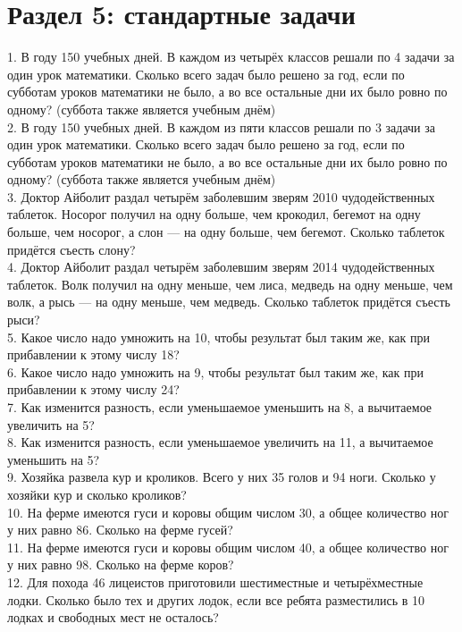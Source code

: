 \section{Раздел 5: стандартные задачи}
1. В году 150 учебных дней. В каждом из четырёх классов решали по 4 задачи за один урок математики. Сколько всего задач было решено за год, если по субботам уроков математики не было, а во все остальные дни их было ровно по одному? (суббота также является учебным днём)\\
2. В году 150 учебных дней. В каждом из пяти классов решали по 3 задачи за один урок математики. Сколько всего задач было решено за год, если по субботам уроков математики не было, а во все остальные дни их было ровно по одному? (суббота также является учебным днём)\\
3. Доктор Айболит раздал четырём заболевшим зверям 2010 чудодейственных таблеток. Носорог получил на одну больше, чем крокодил, бегемот на одну больше, чем носорог, а слон --- на одну больше, чем бегемот. Сколько таблеток придётся съесть слону?\\
4. Доктор Айболит раздал четырём заболевшим зверям 2014 чудодейственных таблеток. Волк получил на одну меньше, чем лиса, медведь на одну меньше, чем волк, а рысь --- на одну меньше, чем медведь. Сколько таблеток придётся съесть рыси?\\
5. Какое число надо умножить на 10, чтобы результат был таким же, как при прибавлении к этому числу 18?\\
6. Какое число надо умножить на 9, чтобы результат был таким же, как при прибавлении к этому числу 24?\\
7. Как изменится разность, если уменьшаемое уменьшить на 8, а вычитаемое увеличить на 5?\\
8. Как изменится разность, если уменьшаемое увеличить на 11, а вычитаемое уменьшить на 5?\\
9. Хозяйка развела кур и кроликов. Всего у них 35 голов и 94 ноги. Сколько у хозяйки кур и сколько кроликов?\\
10. На ферме имеются гуси и коровы общим числом 30, а общее количество ног у них равно 86. Сколько на ферме гусей?\\
11. На ферме имеются гуси и коровы общим числом 40, а общее количество ног у них равно 98. Сколько на ферме коров?\\
12. Для похода 46 лицеистов приготовили шестиместные и четырёхместные лодки. Сколько было тех и других лодок, если все ребята разместились в 10 лодках и свободных мест не осталось?\\
